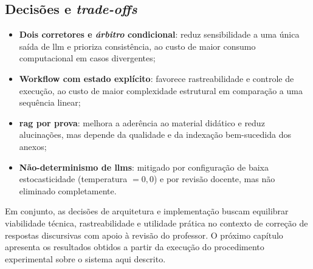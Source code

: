 \subsection{Decisões e \textit{trade-offs}}

\begin{itemize}
    \item \textbf{Dois corretores e \textit{árbitro} condicional}: reduz sensibilidade a uma única saída de \gls{llm} e prioriza consistência, ao custo de maior consumo computacional em casos divergentes;
    \item \textbf{Workflow com estado explícito}: favorece rastreabilidade e controle de execução, ao custo de maior complexidade estrutural em comparação a uma sequência linear;
    \item \textbf{\gls{rag} por prova}: melhora a aderência ao material didático e reduz alucinações, mas depende da qualidade e da indexação bem-sucedida dos anexos;
    \item \textbf{Não-determinismo de \gls{llm}s}: mitigado por configuração de baixa estocasticidade (temperatura $= 0{,}0$) e por revisão docente, mas não eliminado completamente.
\end{itemize}

Em conjunto, as decisões de arquitetura e implementação buscam equilibrar viabilidade técnica, rastreabilidade e utilidade prática no contexto de correção de respostas discursivas com apoio à revisão do professor. O próximo capítulo apresenta os resultados obtidos a partir da execução do procedimento experimental sobre o sistema aqui descrito.
